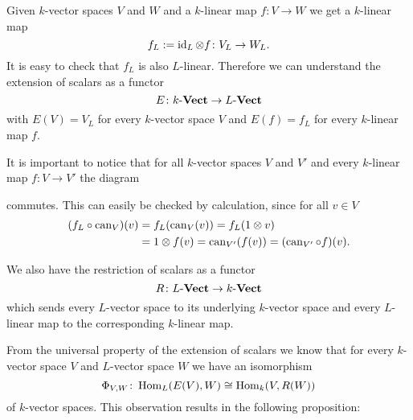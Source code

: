 Given $k$-vector spaces $V$ and $W$ and a $k$-linear map $f \colon V \to W$ we get a $k$-linear map
\[
 f_L := \operatorname{id}_L \otimes f \colon V_L \to W_L.
\]
It is easy to check that $f_L$ is also $L$-linear. Therefore we can understand the extension of scalars as a functor
\[
 E \colon k\text{-}\mathbf{Vect} \to L\text{-}\mathbf{Vect}
\]
with $E(V) = V_L$ for every $k$-vector space $V$ and $E(f) = f_L$ for every $k$-linear map $f$.

It is important to notice that for all $k$-vector spaces $V$ and $V'$ and every $k$-linear map $f \colon V \to V'$ the diagram
\begin{center}
\end{center}
commutes. This can easily be checked by calculation, since for all $v \in V$
\begin{align*}
 (f_L \circ \operatorname{can}_V)(v)
 &= f_L(\operatorname{can}_V(v))
 = f_L(1 \otimes v) \\
 &= 1 \otimes f(v)
 = \operatorname{can}_{V'}(f(v))
 = (\operatorname{can}_{V'} \circ f)(v).
\end{align*}

We also have the restriction of scalars as a functor
\[
 R \colon L\text{-}\mathbf{Vect} \to k\text{-}\mathbf{Vect}
\]
which sends every $L$-vector space to its underlying $k$-vector space and every $L$-linear map to the corresponding $k$-linear map.
 
From the universal property of the extension of scalars we know that for every $k$-vector space $V$ and $L$-vector space $W$ we have an isomorphism
\[
 \Phi_{V,W} \colon \operatorname{Hom}_L(E(V),W) \cong \operatorname{Hom}_k(V,R(W))
\]
of $k$-vector spaces. This observation results in the following proposition:
 
